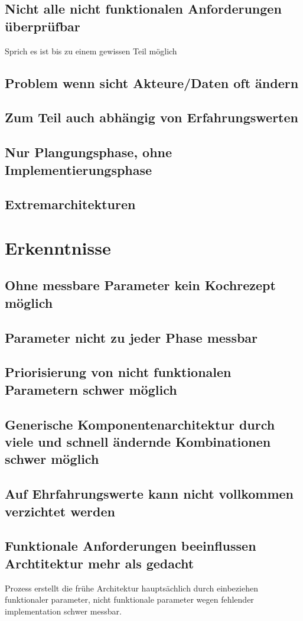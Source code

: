 \subsection{Nicht alle nicht funktionalen Anforderungen überprüfbar}
Sprich es ist bis zu einem gewissen Teil möglich
\subsection{Problem wenn sicht Akteure/Daten oft ändern}
\subsection{Zum Teil auch abhängig von Erfahrungswerten}
\subsection{Nur Plangungsphase, ohne Implementierungsphase}
\subsection{Extremarchitekturen}

\section{Erkenntnisse}
\subsection{Ohne messbare Parameter kein Kochrezept möglich}
\subsection{Parameter nicht zu jeder Phase messbar}
\subsection{Priorisierung von nicht funktionalen Parametern schwer möglich}
\subsection{Generische Komponentenarchitektur durch viele und schnell ändernde Kombinationen schwer möglich}
\subsection{Auf Ehrfahrungswerte kann nicht vollkommen verzichtet werden}
\subsection{Funktionale Anforderungen beeinflussen Archtitektur mehr als gedacht}
Prozess erstellt die frühe Architektur hauptsächlich durch einbeziehen funktionaler parameter, nicht funktionale parameter wegen fehlender implementation schwer messbar.

